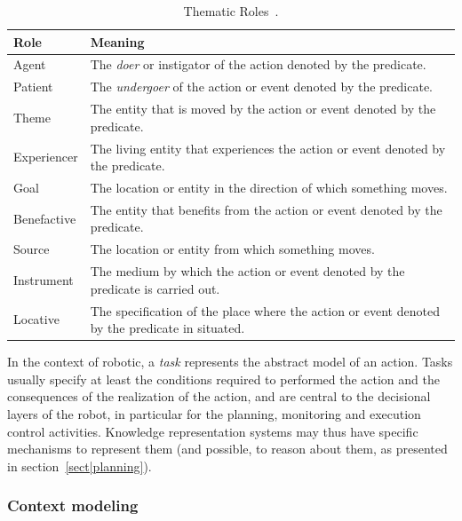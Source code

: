 \documentclass[a4paper, twocolumn]{article}
\begin{document}
\begin{table}
\begin{center}

\begin{tabular}{lp{5cm}}

\toprule
       Role & Meaning \\
\midrule
      Agent & The \emph{doer} or instigator of the action denoted by the predicate. \\
    Patient & The \emph{undergoer} of the action or event denoted by the predicate. \\
      Theme & The entity that is moved by the action or event denoted by the predicate. \\
Experiencer & The living entity that experiences the action or event denoted by the predicate. \\
       Goal & The location or entity in the direction of which something moves. \\
Benefactive & The entity that benefits from the action or event denoted by the predicate. \\
     Source & The location or entity from which something moves. \\
 Instrument & The medium by which the action or event denoted by the predicate is carried out. \\
   Locative & The specification of the place where the action or event denoted by the predicate in situated. \\
\bottomrule

\end{tabular}
\end{center}
\caption{Thematic Roles~\cite{Aarts1997}.}
\label{table|theta-roles}
\end{table}

In the context of robotic, a \emph{task} represents the abstract model of an
action. Tasks usually specify at least the conditions required to performed the
action and the consequences of the realization of the action, and are central
to the decisional layers of the robot, in particular for the planning,
monitoring and execution control activities. Knowledge representation systems
may thus have specific mechanisms to represent them (and possible, to reason
about them, as presented in section~\ref{sect|planning}).





\subsubsection{Context modeling}
\end{document}

